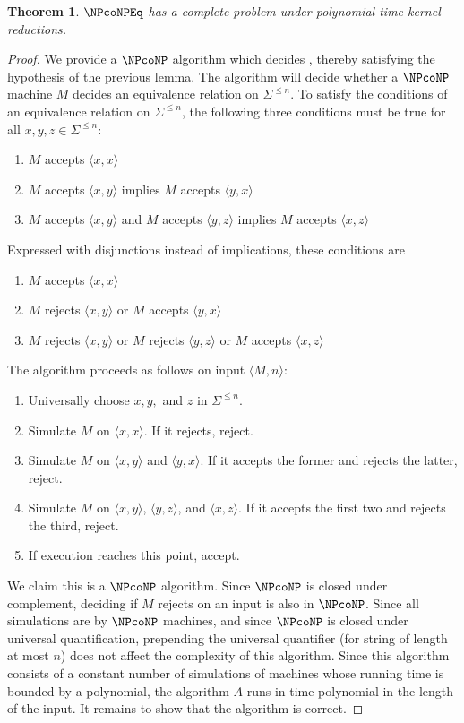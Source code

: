 \documentclass[draft]{article}
\newtheorem{theorem}{Theorem}[section]
\theoremstyle{definition} \newtheorem{openproblem}[openproblem]{Open problem}
\theoremstyle{definition} \newtheorem{definition}[definition]{Definition}
\theoremstyle{remark} \newtheorem{remark}[remark]{Remark}
\newcommand{\pair}[2]{\langle#1,#2\rangle} %
\begin{document}
\begin{theorem}\label{thm:completeproblem}
  $\NPcoNPEq$ has a complete problem under polynomial time kernel reductions.
\end{theorem}
\begin{proof}
  We provide a $\NPcoNP$ algorithm which decides , thereby satisfying the hypothesis of the previous lemma.
  The algorithm will decide whether a $\NPcoNP$ machine $M$ decides an equivalence relation on $\Sigma^{\leq n}$.
  To satisfy the conditions of an equivalence relation on $\Sigma^{\leq n}$, the following three conditions must be true for all $x,y,z\in\Sigma^{\leq n}$:
  \begin{enumerate}
  \item $M$ accepts $\pair{x}{x}$
  \item $M$ accepts $\pair{x}{y}$ implies $M$ accepts $\pair{y}{x}$
  \item $M$ accepts $\pair{x}{y}$ and $M$ accepts $\pair{y}{z}$ implies $M$ accepts $\pair{x}{z}$
  \end{enumerate}
  Expressed with disjunctions instead of implications, these conditions are
  \begin{enumerate}
  \item $M$ accepts $\pair{x}{x}$
  \item $M$ rejects $\pair{x}{y}$ or $M$ accepts $\pair{y}{x}$
  \item $M$ rejects $\pair{x}{y}$ or $M$ rejects $\pair{y}{z}$ or $M$ accepts $\pair{x}{z}$
  \end{enumerate}
  The algorithm proceeds as follows on input $\pair{M}{n}$:
  \begin{enumerate}
  \item Universally choose $x,y,$ and $z$ in $\Sigma^{\leq n}$.
  \item Simulate $M$ on $\pair{x}{x}$.
    If it rejects, reject.
  \item Simulate $M$ on $\pair{x}{y}$ and $\pair{y}{x}$.
    If it accepts the former and rejects the latter, reject.
  \item Simulate $M$ on $\pair{x}{y}$, $\pair{y}{z}$, and $\pair{x}{z}$.
    If it accepts the first two and rejects the third, reject.
  \item If execution reaches this point, accept.
  \end{enumerate}

  We claim this is a $\NPcoNP$ algorithm.
  Since $\NPcoNP$ is closed under complement, deciding if $M$ rejects on an input is also in $\NPcoNP$.
  Since all simulations are by $\NPcoNP$ machines, and since $\NPcoNP$ is closed under universal quantification, prepending the universal quantifier (for string of length at most $n$) does not affect the complexity of this algorithm.
  Since this algorithm consists of a constant number of simulations of machines whose running time is bounded by a polynomial, the algorithm $A$ runs in time polynomial in the length of the input.
  It remains to show that the algorithm is correct.


\end{proof}
\end{document}
